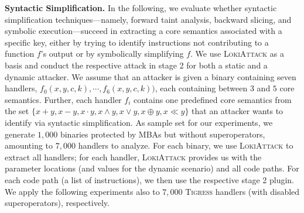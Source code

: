 \documentclass[letterpaper,twocolumn,10pt]{article}
\theoremstyle{customexample}
\theoremstyle{customexperiment}
\newcommand{\lokiattack}{\textsc{LokiAttack}\xspace}
\newcommand{\tigress}{\textsc{Tigress}\xspace}
\begin{document}
\textbf{Syntactic Simplification.}\label{sec:evaluaton:syntactic_attacks}
In the following, we evaluate whether syntactic simplification techniques---namely, forward taint analysis, backward slicing, and symbolic execution---succeed in extracting a core semantics associated with a specific key, either by trying to identify instructions not contributing to a function $f$'s output or by symbolically simplifying $f$.
We use \lokiattack as a basis and conduct the respective attack in stage 2 for both a static and a dynamic attacker.
We assume that an attacker is given a binary containing seven handlers, $f_0(x, y, c, k), \cdots, f_6(x, y, c, k))$, each containing between $3$ and $5$ core semantics. Further, each handler $f_i$ contains one predefined core semantics from the set $\{x+ y, x -y ,x \cdot y, x\land y, x\lor y, x\oplus y , x \ll y \}$ that an attacker wants to identify via syntactic simplification. As sample set for our experiments, we generate $1,000$ binaries protected by MBAs but without superoperators, amounting to $7,000$ handlers to analyze. For each binary, we use \lokiattack to extract all handlers; for each handler, \lokiattack provides us with the parameter locations (and values for the dynamic scenario) and all code paths. For each code path (a list of instructions), we then use the respective stage 2 plugin.
We apply the following experiments also to $7,000$ \tigress handlers (with disabled superoperators), respectively.
\end{document}
